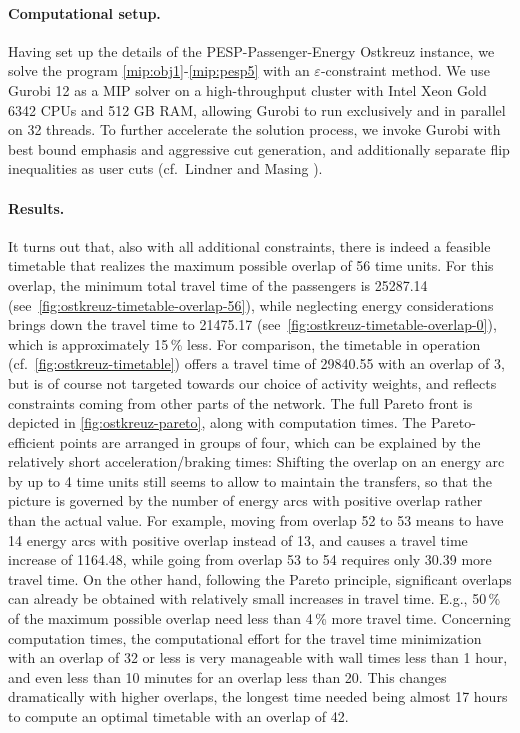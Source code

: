 \documentclass[11pt,a4paper]{article}
\newcommand{\pesppassenergy}{PESP-Passenger-Energy\xspace}
\theoremstyle{definition}
\theoremstyle{remark}
\begin{document}
\paragraph{Computational setup.}
Having set up the details of the \pesppassenergy Ostkreuz instance, we solve the program \eqref{mip:obj1}-\eqref{mip:pesp5} with an $\varepsilon$-constraint method. We use Gurobi 12 \cite{gurobi} as a MIP solver on a high-throughput cluster with Intel Xeon Gold 6342 CPUs and 512 GB RAM, allowing Gurobi to run exclusively and in parallel on 32 threads. To further accelerate the solution process, we invoke Gurobi with best bound emphasis and aggressive cut generation, and additionally separate flip inequalities as user cuts (cf.\ Lindner and Masing \cite{lindner_split_2025}).

\paragraph{Results.}
It turns out that, also with all additional constraints, there is indeed a feasible timetable that realizes the maximum possible overlap of 56 time units. For this overlap, the minimum total travel time of the passengers is 25287.14 (see~\cref{fig:ostkreuz-timetable-overlap-56}), while neglecting energy considerations brings down the travel time to 21475.17 (see~\cref{fig:ostkreuz-timetable-overlap-0}), which is approximately 15\,\% less. For comparison, the timetable in operation (cf.\ \cref{fig:ostkreuz-timetable}) offers a travel time of 29840.55 with an overlap of 3, but is of course not targeted towards our choice of activity weights, and reflects constraints coming from other parts of the network. The full Pareto front is depicted in \cref{fig:ostkreuz-pareto}, along with computation times. The Pareto-efficient points are arranged in groups of four, which can be explained by the relatively short acceleration/braking times: Shifting the overlap on an energy arc by up to 4 time units still seems to allow to maintain the transfers, so that the picture is governed by the number of energy arcs with positive overlap rather than the actual value. For example, moving from overlap 52 to 53 means to have 14 energy arcs with positive overlap instead of 13, and causes a travel time increase of 1164.48, while going from overlap 53 to 54 requires only 30.39 more travel time. On the other hand, following the Pareto principle, significant overlaps can already be obtained with relatively small increases in travel time. E.g., 50\,\% of the maximum possible overlap need less than 4\,\% more travel time. Concerning computation times, the computational effort for the travel time minimization with an overlap of 32 or less is very manageable with wall times less than 1 hour, and even less than 10 minutes for an overlap less than 20. This changes dramatically with higher overlaps, the longest time needed being almost 17 hours to compute an optimal timetable with an overlap of 42.
\end{document}
